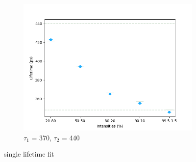 \begin{figure}[p]
{        \begin{subfigure}{0.7\textwidth}
            \centering
            \includegraphics[width=0.95\linewidth]{Batch 7/348-440/output/1 life/lifetime.png}
            \caption{$\tau_1$ = 370, $\tau_2$ = 440}
            \label{fig:1life_348}
        \end{subfigure}
    }
    \label{fig:1life}
    \caption{single lifetime fit} 
\end{figure}

